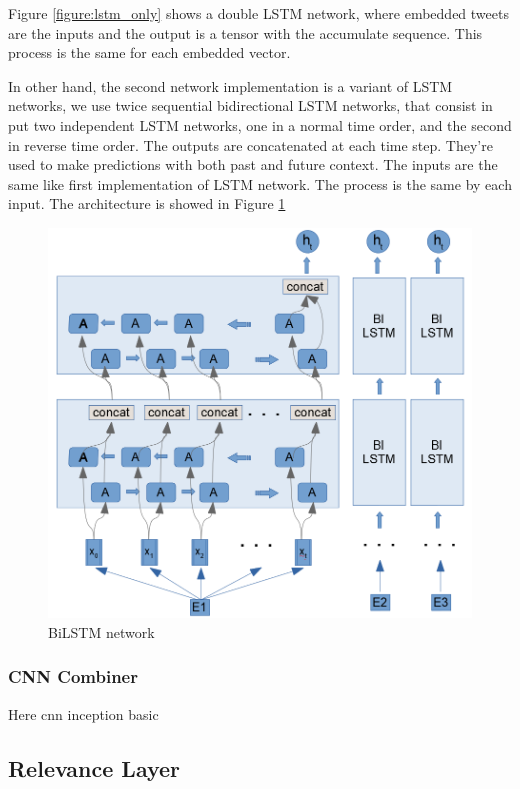 \documentclass[12pt]{report}
\begin{document}
Figure \ref{figure:lstm_only} shows a double \ac{LSTM} network, where embedded tweets are the inputs and the output is a tensor with the accumulate sequence. This process is the same for each embedded vector.

In other hand, the second network implementation is a variant of \ac{LSTM} networks, we use twice sequential bidirectional LSTM networks, that consist in put two independent \ac{LSTM} networks, one in a normal time order, and the second in reverse time order. The outputs are concatenated at each time step. They’re used to make predictions with both past and future context. The inputs are the same like first implementation of \ac{LSTM} network. The process is the same by each input. The architecture is showed in Figure \ref{figure:bilstm}

\begin{figure}[H]	
	\centering
	\includegraphics[width=150mm, scale = 1]{images/13_bilstm.png}	
	\caption{BiLSTM network}	
	\label{figure:bilstm}
\end{figure}
  
\subsubsection{\ac{CNN} Combiner}

Here cnn inception basic

\subsection{Relevance Layer}
\end{document}
